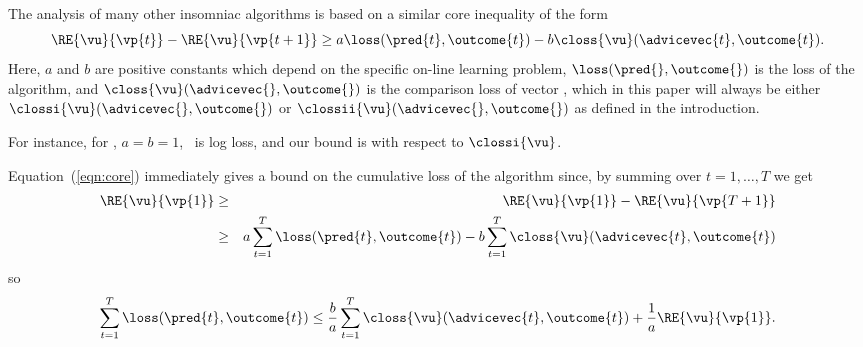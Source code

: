 The analysis of many other insomniac algorithms is based on a similar
core inequality of the form
\begin{equation} \label{eqn:core}
  \RE{\vu}{\vp{t}} - \RE{\vu}{\vp{t+1}}
    \geq a \loss(\pred{t},\outcome{t})
       - b \closs{\vu}(\advicevec{t},\outcome{t}).
\end{equation}
Here, $a$ and $b$ are positive constants which depend on the
specific on-line learning problem, $\loss(\pred{},\outcome{})$ is the
loss of the algorithm, and $\closs{\vu}(\advicevec{},\outcome{})$ is
the comparison loss of vector \vu, which in this paper will always
be either 
$\clossi{\vu}(\advicevec{},\outcome{})$ or
$\clossii{\vu}(\advicevec{},\outcome{})$ as defined in the introduction.
\iffalse
the two types of comparison losses that interest us here are
$\clossi{\vu}(\advicevec{},\outcome{}) \doteq \sum_{i} \uu{i}
\loss(\advicei{i},\outcome{})$ and 
$\clossii{\vu}(\advicevec{},\outcome{}) \doteq 
\loss(\sum_{i} \uu{i}\advicei{i},\outcome{})$.
\fi
For instance, for \Bayes, $a=b=1$, \loss\ is log loss, and
our bound is with respect to $\clossi{\vu}$.

Equation~(\ref{eqn:core}) immediately gives a bound on the cumulative
loss of the algorithm since, by summing over $t=1,\ldots,T$ we get
\begin{eqnarray*}
  \RE{\vu}{\vp{1}} & \geq &
     \RE{\vu}{\vp{1}} - \RE{\vu}{\vp{T+1}} \\
    & \geq & a \sum_{t=1}^T \loss(\pred{t},\outcome{t})
       - b \sum_{t=1}^T \closs{\vu}(\advicevec{t},\outcome{t})
\end{eqnarray*}
so
\begin{equation} \label{eqn:insombound}
  \sum_{t=1}^T \loss(\pred{t},\outcome{t}) \leq 
    \frac{b}{a} \sum_{t=1}^T \closs{\vu}(\advicevec{t},\outcome{t})
    + \frac{1}{a} \RE{\vu}{\vp{1}}.
\end{equation}

